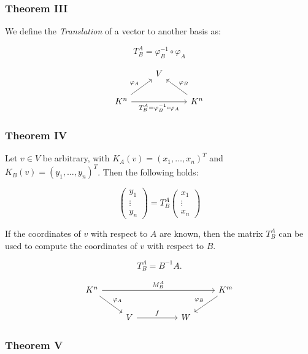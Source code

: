 \subsubsection{Theorem III} 

We define the \emph{Translation} of a vector to another basis as:

\[
    T_{B}^{A} = \varphi_{B}^{-1} \circ \varphi_A
\]

\[
    \begin{tikzcd}
    & V & \\
    K^n \arrow[ur, "\varphi_A"] \arrow[rr, "T_{B}^{A} = \varphi_B^{-1} \circ \varphi_A"'] & & K^n \arrow[ul, "\varphi_B"']
    \end{tikzcd}
\]

\subsubsection{Theorem IV} 

Let \( v \in V \) be arbitrary, with \( K_A(v) = {(x_1, \dots, x_n)}^T \) 
and \( K_B(v) = {(y_1, \dots, y_n)}^T \).  Then the following holds:

\[
    \begin{pmatrix}
    y_1 \\
    \vdots \\
    y_n
    \end{pmatrix}
    =
    T_B^A
    \begin{pmatrix}
    x_1 \\
    \vdots \\
    x_n
    \end{pmatrix}
\]

If the coordinates of \( v \) with respect to \(A\) are known, then the matrix \( T_B^A \) can be used to compute the coordinates of \( v \) with respect to \(B\).

\[ 
    T_B^A = B^{-1}A. 
\]

\[
    \begin{tikzcd}
        K^n \arrow[rrrr, "M_{B}^{A}"] \arrow[rd, "\varphi_A"] &                   &  &   & K^m \arrow[ld, "\varphi_B"'] \\
                                                              & V \arrow[rr, "f"] &  & W &                             
        \end{tikzcd}
\]

\subsubsection{Theorem V}
 
